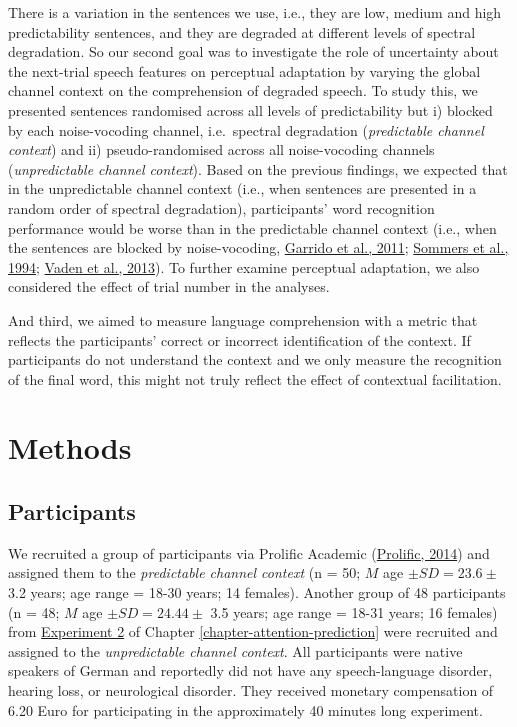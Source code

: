 \documentclass[a4paper, nobind]{templates/ociamthesis}
\begin{document}
There is a variation in the sentences we use, i.e., they are low, medium and high predictability sentences, and they are degraded at different levels of spectral degradation.
So our second goal was to investigate the role of uncertainty about the next-trial speech features on perceptual adaptation by varying the global channel context on the comprehension of degraded speech.
To study this, we presented sentences randomised across all levels of predictability but
i) blocked by each noise-vocoding channel, i.e.~spectral degradation (\emph{predictable channel context}) and
ii) pseudo-randomised across all noise-vocoding channels (\emph{unpredictable channel context}).
Based on the previous findings, we expected that in the unpredictable channel context (i.e., when sentences are presented in a random order of spectral degradation), participants' word recognition performance would be worse than in the predictable channel context (i.e., when the sentences are blocked by noise-vocoding, \protect\hyperlink{ref-Garrido2011}{Garrido et al., 2011}; \protect\hyperlink{ref-Sommers1994}{Sommers et al., 1994}; \protect\hyperlink{ref-Vaden2013}{Vaden et al., 2013}).
To further examine perceptual adaptation, we also considered the effect of trial number in the analyses.

And third, we aimed to measure language comprehension with a metric that reflects the participants' correct or incorrect identification of the context.
If participants do not understand the context and we only measure the recognition of the final word, this might not truly reflect the effect of contextual facilitation.

\hypertarget{methods-2}{%
\section{Methods}\label{methods-2}}

\hypertarget{participants-1}{%
\subsection{Participants}\label{participants-1}}

We recruited a group of participants via Prolific Academic (\protect\hyperlink{ref-Prolific}{Prolific, 2014}) and assigned them to the \emph{predictable channel context} (n = 50; \(M\) age \(\pm SD=23.6\pm\) 3.2 years; age range = 18-30 years; 14 females).
Another group of 48 participants (n = 48; \(M\) age \(\pm SD=24.44\pm\) 3.5 years; age range = 18-31 years; 16 females) from \protect\hyperlink{experiment1b}{Experiment 2} of Chapter \ref{chapter-attention-prediction} were recruited and assigned to the \emph{unpredictable channel context}.
All participants were native speakers of German and reportedly did not have any speech-language disorder, hearing loss, or neurological disorder.
They received monetary compensation of 6.20 Euro for participating in the approximately 40 minutes long experiment.
\end{document}

